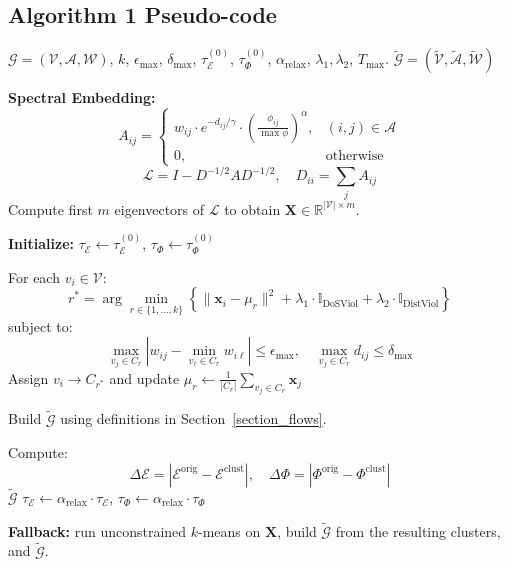 \documentclass[lettersize,journal]{IEEEtran}
\begin{document}
\subsection{Algorithm 1 Pseudo-code}
\begin{algorithm}[H]
\caption{Constrained Spectral Clustering for Bike Networks}
\label{alg:constrained-clustering-math}
\begin{algorithmic}[1]
\Require$\mathcal{G} = (\mathcal{V}, \mathcal{A}, \mathcal{W})$, 
  $k$,
  $\epsilon_{\max}$, 
  $\delta_{\max}$, 
  $\tau_{\mathcal{E}}^{(0)}$, $\tau_{\Phi}^{(0)}$, 
  $\alpha_{\text{relax}}$, 
  $\lambda_1,\lambda_2$, 
  $T_{\max}$.
\Ensure $\tilde{\mathcal{G}} = (\tilde{\mathcal{V}}, \tilde{\mathcal{A}}, \tilde{\mathcal{W}})$

\State \textbf{Spectral Embedding:}
\[
A_{ij} =
\begin{cases}
w_{ij} \cdot e^{-d_{ij}/\gamma} \cdot \left(\frac{\phi_{ij}}{\max \phi}\right)^\alpha, & (i,j) \in \mathcal{A} \\
0, & \text{otherwise}
\end{cases}
\]
\[
\mathcal{L} = I - D^{-1/2} A D^{-1/2}, \quad D_{ii} = \sum_j A_{ij}
\]
Compute first $m$ eigenvectors of $\mathcal{L}$ to obtain $\mathbf{X} \in \mathbb{R}^{|\mathcal{V}| \times m}$.

\State \textbf{Initialize:} $\tau_{\mathcal{E}} \gets \tau_{\mathcal{E}}^{(0)}$, \quad $\tau_{\Phi} \gets \tau_{\Phi}^{(0)}$

    \State For each $v_i \in \mathcal{V}$:
    \[
    r^* = \arg\min_{r \in \{1, \dots, k\}} \left\{ \|\mathbf{x}_i - \mu_r\|^2 + \lambda_1 \cdot \mathbb{I}_{\text{DoSViol}} + \lambda_2 \cdot \mathbb{I}_{\text{DistViol}} \right\}
    \]
    subject to:
    \[
    \max_{v_j \in C_r} \left| w_{ij} - \min_{v_\ell \in C_r} w_{i\ell} \right| \leq \epsilon_{\max}, \quad
    \max_{v_j \in C_r} d_{ij} \leq \delta_{\max}
    \]
    Assign $v_i \to C_{r^*}$ and update $\mu_r \gets \frac{1}{|C_r|} \sum_{v_j \in C_r} \mathbf{x}_j$

    \State Build $\tilde{\mathcal{G}}$ using definitions in Section~\ref{section_flows}.

    \State Compute:
    \[
    \Delta\mathcal{E} = \left| \mathcal{E}^{\text{orig}} - \mathcal{E}^{\text{clust}} \right|, \quad
    \Delta\Phi = \left| \Phi^{\text{orig}} - \Phi^{\text{clust}} \right|
    \]
        \State \Return $\tilde{\mathcal{G}}$
    \Else
        \State $\tau_{\mathcal{E}} \gets \alpha_{\text{relax}} \cdot \tau_{\mathcal{E}}$, \quad
              $\tau_{\Phi} \gets \alpha_{\text{relax}} \cdot \tau_{\Phi}$
    \EndIf
\EndFor

\State \textbf{Fallback:} run unconstrained $k$-means on $\mathbf{X}$, build $\tilde{\mathcal{G}}$ from the resulting clusters, and \Return $\tilde{\mathcal{G}}$.
\end{algorithmic}
\end{algorithm}
\end{document}
